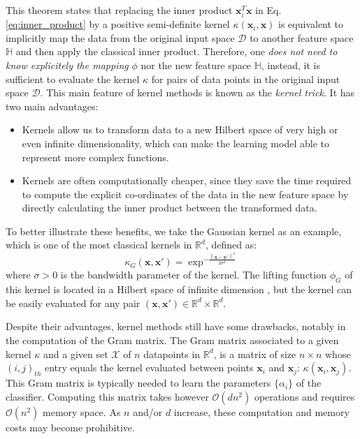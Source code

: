 This theorem states that replacing the inner product $\mathbf{x}_i^T\mathbf{x}$ in Eq. \ref{eq:inner_product} by a positive semi-definite kernel $\kappa(\mathbf{x}_i,\mathbf{x})$ is equivalent to implicitly map the data from the original input space $\mathcal{D}$ to another feature space $\mathbb{H}$ and then apply the classical inner product. Therefore, one \emph{does not need to know explicitely the mapping} $\phi$ nor the new feature space $\mathbb{H}$, instead, it is sufficient to evaluate the kernel $\kappa$ for pairs of data points in the original input space $\mathcal{D}$. This main feature of kernel methods is known as the \emph{kernel trick}. It has two main advantages:
\begin{itemize}
	\item Kernels allow us to transform data to a new Hilbert space of very high or even infinite dimensionality, which can make the learning model able to represent more complex functions.
	\item Kernels are often computationally cheaper, since they save the time required to compute the explicit co-ordinates of the data in the new feature space by directly calculating the inner product between the transformed data.
\end{itemize}
To better illustrate these benefits, we take the Gaussian kernel as an example, which is one of the most classical kernels in $\mathbb{R}^d$, defined as:
\begin{equation}
\label{eq:Guassian_kernel}
\kappa_{G}(\mathbf{x},\mathbf{x}')=\exp^{-\frac{\left \| \mathbf{x}-\mathbf{x}'\right\|^2}{2\sigma^2}}
\end{equation}
where $\sigma>0$ is the bandwidth parameter of the kernel. The lifting function $\phi_G$ of this kernel is located in a Hilbert space of infinite dimension , but the kernel can be easily evaluated for any pair $(\mathbf{x},\mathbf{x}')\in\mathbb{R}^d\times \mathbb{R}^d$.

Despite their advantages, kernel methods still have some drawbacks, notably in the computation of the Gram matrix. The Gram matrix associated to a given kernel $\kappa$ and a given set $\mathcal{X}$ of $n$ datapoints in $\mathbb{R}^d$, is a matrix of size $n\times n$ whose $(i,j)_{th}$ entry equals the kernel evaluated between points $\mathbf{x}_i$ and $\mathbf{x}_j$: $\kappa(\mathbf{x}_i, \mathbf{x}_j)$. This Gram matrix is typically needed to learn the parameters $\{\alpha_i\}$ of the classifier. Computing this matrix takes however $\mathcal{O}(dn^2)$ operations and requires $\mathcal{O}(n^2)$ memory space. As $n$ and/or $d$ increase, these computation and memory costs may become prohibitive. 

